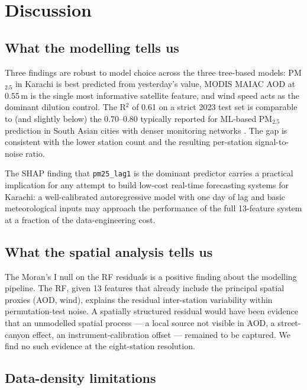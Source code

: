 \documentclass{iopjournal}
\begin{document}
\section{Discussion}
\label{sec:disc}

\subsection{What the modelling tells us}

Three findings are robust to model choice across the three
tree-based models: PM$_{2.5}$ in Karachi is best predicted from
yesterday's value, MODIS MAIAC AOD at 0.55\,\textmu m is the
single most informative satellite feature, and wind speed acts as
the dominant dilution control. The R$^{2}$ of 0.61 on a strict
2023 test set is comparable to (and slightly below) the
0.70--0.80 typically reported for ML-based PM$_{2.5}$ prediction
in South Asian cities with denser monitoring networks
\cite{Chen2021, Brokamp2018, Sayeed2021}. The gap is consistent
with the lower station count and the resulting per-station
signal-to-noise ratio.

The SHAP finding that \texttt{pm25\_lag1} is the dominant
predictor carries a practical implication for any attempt to
build low-cost real-time forecasting systems for Karachi: a
well-calibrated autoregressive model with one day of lag and
basic meteorological inputs may approach the performance of the
full 13-feature system at a fraction of the data-engineering cost.

\subsection{What the spatial analysis tells us}

The Moran's I null on the RF residuals is a positive finding about
the modelling pipeline. The RF, given 13 features that already
include the principal spatial proxies (AOD, wind), explains the
residual inter-station variability within permutation-test
noise. A spatially structured residual would have been evidence
that an unmodelled spatial process --- a local source not visible
in AOD, a street-canyon effect, an instrument-calibration offset
--- remained to be captured. We find no such evidence at the
eight-station resolution.

\subsection{Data-density limitations}
\end{document}
